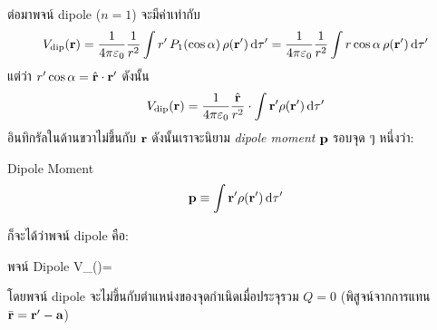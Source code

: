 ต่อมาพจน์ dipole ($n=1$) จะมีค่าเท่ากับ
\[V_\txt{dip}(\vb{r})=\kem\frac{1}{r^2}\int r'\,P_1(\cos\alpha)\,\rho(\vb{r}')\odif{\tau'}=\kem\frac{1}{r^2}\int r\cos\alpha\,\rho(\vb{r}')\odif{\tau'}\]
แต่ว่า $r'\cos\alpha=\hat{\mathbf{r}}\cdot\mathbf{r}'$ ดังนั้น
\[V_\txt{dip}(\vb{r})=\kem\frac{\vu{r}}{r^2}\cdot\int\vb{r}'\rho(\vb{r}')\odif{\tau'}\]
อินทิกรัลในด้านขวาไม่ขึ้นกับ $\mathbf{r}$ ดังนั้นเราจะนิยาม \emph{dipole moment} $\mathbf{p}$ รอบจุด ๆ หนึ่งว่า:
\begin{defbox}{ Dipole Moment}
    \begin{equation}
        \vb{p}\equiv\int\vb{r}'\rho(\vb{r}')\odif{\tau'}
    \end{equation}
\end{defbox}
ก็จะได้ว่าพจน์ dipole คือ:
\begin{eqbox}{พจน์ Dipole}
    V_()=\kem{}\label{dippotential}
\end{eqbox}
โดยพจน์ dipole จะไม่ขึ้นกับตำแหน่งของจุดกำเนิดเมื่อประจุรวม $Q=0$ (พิสูจน์จากการแทน $\bar{\mathbf{r}}=\mathbf{r}'-\mathbf{a}$)
